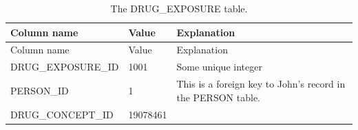 \documentclass[11pt]{book}
\theoremstyle{definition}
\theoremstyle{definition}
\theoremstyle{definition}
\theoremstyle{remark}
\begin{document}
\begin{longtable}[]{@{}lll@{}}
\caption{\label{tab:johnDrug} The DRUG\_EXPOSURE table.}\tabularnewline
\toprule
\begin{minipage}[b]{0.28\columnwidth}\raggedright
Column name\strut
\end{minipage} & \begin{minipage}[b]{0.15\columnwidth}\raggedright
Value\strut
\end{minipage} & \begin{minipage}[b]{0.49\columnwidth}\raggedright
Explanation\strut
\end{minipage}\tabularnewline
\midrule
\endfirsthead
\toprule
\begin{minipage}[b]{0.28\columnwidth}\raggedright
Column name\strut
\end{minipage} & \begin{minipage}[b]{0.15\columnwidth}\raggedright
Value\strut
\end{minipage} & \begin{minipage}[b]{0.49\columnwidth}\raggedright
Explanation\strut
\end{minipage}\tabularnewline
\midrule
\endhead
\begin{minipage}[t]{0.28\columnwidth}\raggedright
DRUG\_EXPOSURE\_ID\strut
\end{minipage} & \begin{minipage}[t]{0.15\columnwidth}\raggedright
1001\strut
\end{minipage} & \begin{minipage}[t]{0.49\columnwidth}\raggedright
Some unique integer\strut
\end{minipage}\tabularnewline
\begin{minipage}[t]{0.28\columnwidth}\raggedright
PERSON\_ID\strut
\end{minipage} & \begin{minipage}[t]{0.15\columnwidth}\raggedright
1\strut
\end{minipage} & \begin{minipage}[t]{0.49\columnwidth}\raggedright
This is a foreign key to John's record in the PERSON table.\strut
\end{minipage}\tabularnewline
\begin{minipage}[t]{0.28\columnwidth}\raggedright
DRUG\_CONCEPT\_ID\strut
\end{minipage} & \begin{minipage}[t]{0.15\columnwidth}\raggedright
19078461\strut
\end{minipage} & \begin{minipage}[t]{0.49\columnwidth}\raggedright

\end{minipage}
\end{longtable}
\end{document}
